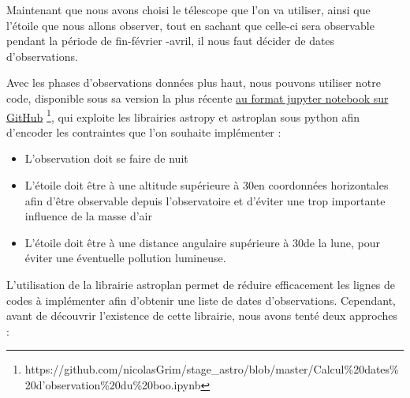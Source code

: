 \documentclass[10pt,french, openany]{book}
\begin{document}
    Maintenant que nous avons choisi le télescope que l'on va utiliser, ainsi que l'étoile que nous allons observer, tout en sachant que celle-ci sera observable pendant la période de fin-février -avril, il nous faut décider de dates d'observations.
    
    Avec les phases d'observations données plus haut, nous pouvons utiliser notre code, disponible sous sa version la plus récente \href{https://github.com/nicolasGrim/stage_astro/blob/master/Calcul\%20dates\%20d'observation\%20du\%20boo.ipynb}{au format jupyter notebook sur GitHub} \footnote{https://github.com/nicolasGrim/stage\_astro/blob/master/Calcul\%20dates\%20d'observation\%20du\%20boo.ipynb}, qui exploite les librairies astropy et astroplan sous python afin d'encoder les contraintes que l'on souhaite implémenter :
    
    \begin{itemize}
        \item L'observation doit se faire de nuit
        \item L'étoile doit être à une altitude supérieure à 30\degree en coordonnées horizontales afin d'être observable depuis l'observatoire et d'éviter une trop importante influence de la masse d'air \cite{site:T5, notes}
        \item L'étoile doit être à une distance angulaire supérieure à 30\degree de la lune, pour éviter une éventuelle pollution lumineuse.
    \end{itemize}
    
    L'utilisation de la librairie astroplan permet de réduire efficacement les lignes de codes à implémenter afin d'obtenir une liste de dates d'observations. Cependant, avant de découvrir l'existence de cette librairie, nous avons tenté deux approches :
    
\end{document}
